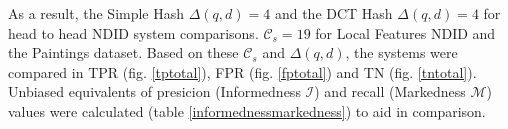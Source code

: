 \documentclass[english,12pt,a4paper,pdftex,elec,utf8, table]{aaltothesis}
\begin{document}



As a result, the Simple Hash $\Delta(q,d)=4$ and the DCT Hash $\Delta(q,d)=4$ for head to head NDID system comparisons. $\mathcal{C}_s=19$ for Local Features NDID and the Paintings dataset. Based on these $\mathcal{C}_s$ and $\Delta(q,d)$, the systems were compared in TPR (fig. \ref{tptotal}), FPR (fig. \ref{fptotal}) and TN (fig. \ref{tntotal}). Unbiased equivalents of presicion (Informedness $\mathcal{I}$) and recall (Markedness $\mathcal{M}$) values were calculated (table \ref{informednessmarkedness}) to aid in comparison.


\end{document}
